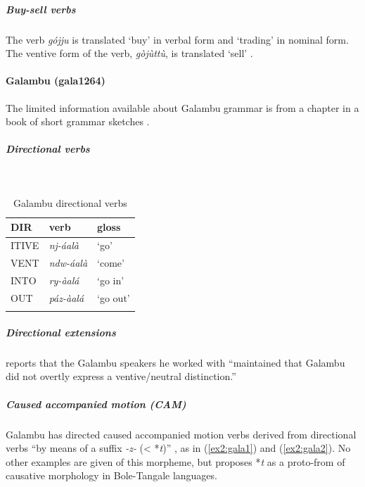 \subparagraph{Buy-sell verbs}



The verb \textit{gójju}  is translated `buy' in verbal form and `trading' in nominal form. The ventive form of the verb, \textit{gòjùttù}, is translated `sell' \citep[36]{gimbaBoleenglishhausaDictionaryAlhaji2004}.

\paragraph*{Galambu (gala1264)} 

The limited information available about Galambu grammar is from a chapter in a book of short grammar sketches \citep{schuhBoleTangaleLanguagesBauchi1978}. 

\subparagraph{Directional verbs}~



\begin{table}[H]
	\caption{Galambu directional verbs} 
	\label{tab:galaV}
	\begin{tabular}{lll} %
		\lsptoprule
		DIR & verb & gloss   \\ %
		\midrule
		ITIVE & \textit{nj-áalà} & `go' \\
		VENT & \textit{ndw-áalà} & `come' \\
		INTO&  \textit{ry-àalá} & `go in' \\
		OUT & \textit{páz-àalá} & `go out' \\
		\lspbottomrule
	\end{tabular}
\end{table}

\subparagraph{Directional extensions}

\citet[67]{schuhBoleTangaleLanguagesBauchi1978} reports that the Galambu speakers he worked with ``maintained that Galambu did not overtly express a ventive/neutral distinction.'' 

\subparagraph{Caused accompanied motion (CAM)}



Galambu has directed caused accompanied motion verbs derived from directional verbs ``by means of a suffix \textit{-z-} (< *\textit{t})'' \citep[76]{schuhBoleTangaleLanguagesBauchi1978}, as in (\ref{ex2:gala1}) and (\ref{ex2:gala2}). No other examples are given of this morpheme, but \citet[309]{schuhChadicCornucopia2017} proposes *\textit{t} as a proto-from of causative morphology in Bole-Tangale languages. 

